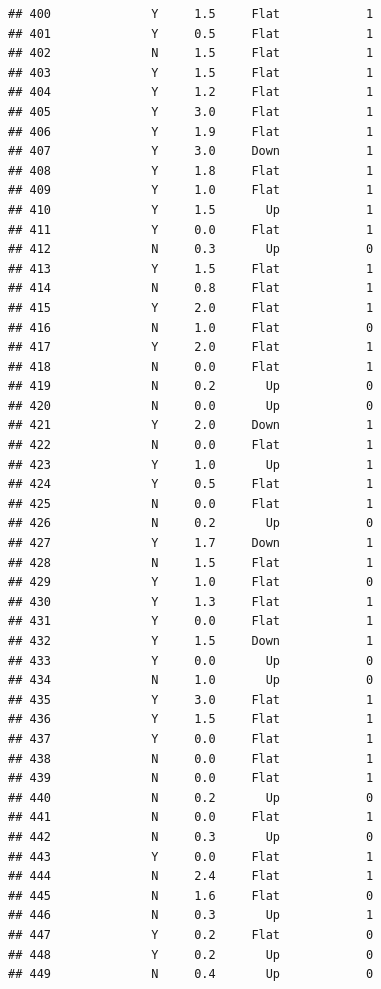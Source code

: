 \documentclass[
]{article}
\begin{document}
\begin{verbatim}
## 400              Y     1.5     Flat            1
## 401              Y     0.5     Flat            1
## 402              N     1.5     Flat            1
## 403              Y     1.5     Flat            1
## 404              Y     1.2     Flat            1
## 405              Y     3.0     Flat            1
## 406              Y     1.9     Flat            1
## 407              Y     3.0     Down            1
## 408              Y     1.8     Flat            1
## 409              Y     1.0     Flat            1
## 410              Y     1.5       Up            1
## 411              Y     0.0     Flat            1
## 412              N     0.3       Up            0
## 413              Y     1.5     Flat            1
## 414              N     0.8     Flat            1
## 415              Y     2.0     Flat            1
## 416              N     1.0     Flat            0
## 417              Y     2.0     Flat            1
## 418              N     0.0     Flat            1
## 419              N     0.2       Up            0
## 420              N     0.0       Up            0
## 421              Y     2.0     Down            1
## 422              N     0.0     Flat            1
## 423              Y     1.0       Up            1
## 424              Y     0.5     Flat            1
## 425              N     0.0     Flat            1
## 426              N     0.2       Up            0
## 427              Y     1.7     Down            1
## 428              N     1.5     Flat            1
## 429              Y     1.0     Flat            0
## 430              Y     1.3     Flat            1
## 431              Y     0.0     Flat            1
## 432              Y     1.5     Down            1
## 433              Y     0.0       Up            0
## 434              N     1.0       Up            0
## 435              Y     3.0     Flat            1
## 436              Y     1.5     Flat            1
## 437              Y     0.0     Flat            1
## 438              N     0.0     Flat            1
## 439              N     0.0     Flat            1
## 440              N     0.2       Up            0
## 441              N     0.0     Flat            1
## 442              N     0.3       Up            0
## 443              Y     0.0     Flat            1
## 444              N     2.4     Flat            1
## 445              N     1.6     Flat            0
## 446              N     0.3       Up            1
## 447              Y     0.2     Flat            0
## 448              Y     0.2       Up            0
## 449              N     0.4       Up            0

\end{verbatim}
\end{document}
